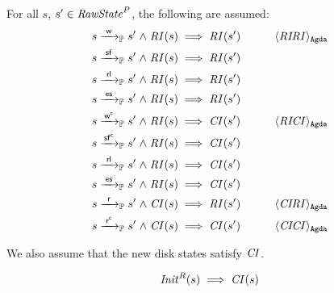 \begin{assumption}\label{peropb}
For all $s$, $s' \in \mathit{RawState}^P$, the following are assumed:
\begin{align*}
s \ttP{\awa{\actw}{\actw }} s' \conj \i{RI}(s) &\implies \i{RI}(s') & \tag*{\AgdaId{\id{RIRI}}} \\
s \ttP{\awa{\actw}{\actf }} s' \conj \i{RI}(s) &\implies \i{RI}(s')\\
s \ttP{\awa{\actw}{\actcp}} s' \conj \i{RI}(s) &\implies \i{RI}(s')\\
s \ttP{\awa{\actw}{\actes}} s' \conj \i{RI}(s) &\implies \i{RI}(s')\\
s \ttP{\awa{\actw}{\actwc}} s' \conj \i{RI}(s) &\implies \i{CI}(s') & \tag*{\AgdaId{\id{RICI}}} \\
s \ttP{\awa{\actw}{\actfc}} s' \conj \i{RI}(s) &\implies \i{CI}(s')\\
s \ttP{\awa{\actw}{\actcp}} s' \conj \i{RI}(s) &\implies \i{CI}(s')\\
s \ttP{\awa{\actw}{\actes}} s' \conj \i{RI}(s) &\implies \i{CI}(s')\\
s \ttP{\awa{\actw}{\actr }} s' \conj \i{CI}(s) &\implies \i{RI}(s') & \tag*{\AgdaId{\id{CIRI}}} \\
s \ttP{\awa{\actw}{\actrc}} s' \conj \i{CI}(s) &\implies \i{CI}(s') & \tag*{\AgdaId{\id{CICI}}}
\end{align*}
\end{assumption}

We also assume that the new disk states satisfy $\mathit{CI}$.

\begin{assumption}
\[ \mathit{Init}^R(s) \implies \mathit{CI}(s) \]
\end{assumption}

